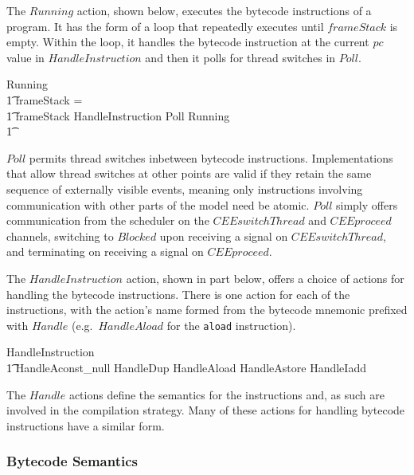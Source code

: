 The $Running$ action, shown below, executes the bytecode instructions
of a program. 
It has the form of a loop that repeatedly executes until $frameStack$
is empty.
Within the loop, it handles the bytecode instruction at the current
$pc$ value in $HandleInstruction$ and then it polls for thread
switches in $Poll$.
\begin{circusaction}
  Running \circdef \\
  \t1 \circif frameStack = \emptyset \circthen \Skip \\
  \t1 {} \circelse frameStack \neq \emptyset \circthen HandleInstruction \circseq Poll \circseq Running \\
  \t1 \circfi
\end{circusaction}
$Poll$ permits thread switches inbetween bytecode instructions.
Implementations that allow thread switches at other points are valid
if they retain the same sequence of externally visible events, meaning
only instructions involving communication with other parts of the
model need be atomic.
$Poll$ simply offers communication from the scheduler on the
$CEEswitchThread$ and $CEEproceed$ channels, switching to $Blocked$
upon receiving a signal on $CEEswitchThread$, and terminating on
receiving a signal on $CEEproceed$.

The $HandleInstruction$ action, shown in part below, offers a choice
of actions for handling the bytecode instructions.
There is one action for each of the instructions, with the action's
name formed from the bytecode mnemonic prefixed with $Handle$ (e.g.\
$HandleAload$ for the \texttt{aload} instruction).
\begin{circusaction}
	HandleInstruction \circdef \\
	\t1 HandleAconst\_null \extchoice HandleDup \extchoice HandleAload \extchoice HandleAstore \extchoice HandleIadd \extchoice {} \cdots
\end{circusaction}

The $Handle$ actions define the semantics for the instructions and, as
such are involved in the compilation strategy.
Many of these actions for handling bytecode instructions have a
similar form.

\subsubsection*{Bytecode Semantics}

